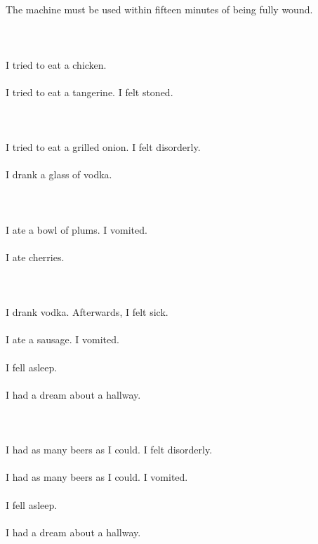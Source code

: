 \documentclass{article}
\begin{document}
    \section{}
    The machine must be used within fifteen minutes of being fully wound.\\\\ 
    \newpage
    
    \section{}
    I tried to eat a chicken.\\\\I tried to eat a tangerine. I felt stoned.\\\\ 
    \newpage
    
    \section{}
    I tried to eat a grilled onion. I felt disorderly.\\\\I drank a glass of vodka.\\\\ 
    \newpage
    
    \section{}
    I ate a bowl of plums. I vomited.\\\\I ate cherries.\\\\ 
    \newpage
    
    \section{}
    I drank vodka. Afterwards, I felt sick.\\\\I ate a sausage. I vomited.\\\\I fell asleep.\\\\I had a dream about a hallway.\\\\ 
    \newpage
    
    \section{}
    I had as many beers as I could. I felt disorderly.\\\\I had as many beers as I could. I vomited.\\\\I fell asleep.\\\\I had a dream about a hallway.\\\\ 
    \newpage
    
\end{document}
